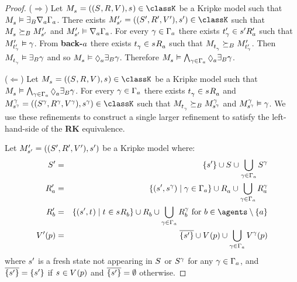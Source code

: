\begin{proof}
($\Rightarrow$) Let $\kPModelAndTuple{\kStateS} \in \classK$ be a Kripke model such that $\kPModel{\kStateS} \entails \somerefsBs \coversA \Gamma_\agentA$.
There exists $\kPModelAndTupleP{\kStateSP} \in \classK$ such that $\kPModel{\kStateS} \simulatesBs \kPModelP{\kStateSP}$ and $\kPModelP{\kStateSP} \entails \coversA \Gamma_\agentA$.
For every $\gamma \in \Gamma_\agentA$ there exists $\kStateTP_\gamma \in \kSuccessorsPA{\kStateSP}$ such that $\kPModelP{\kStateTP_\gamma} \entails \gamma$.
From {\bf back-$\agentA$} there exists $\kStateT_\gamma \in \kSuccessorsA{\kStateS}$ such that $\kPModel{\kStateT_\gamma} \simulatesBs \kPModelP{\kStateTP_\gamma}$.
Then $\kPModel{\kStateT_\gamma} \entails \somerefsBs \gamma$ and so $\kPModel{\kStateS} \entails \possibleA \somerefsBs \gamma$.
Therefore $\kPModel{\kStateS} \entails \bigwedge_{\gamma \in \Gamma_\agentA} \possibleA \somerefsBs \gamma$.

($\Leftarrow$) Let $\kPModelAndTuple{\kStateS} \in \classK$ be a Kripke model such that $\kPModel{\kStateS} \entails \bigwedge_{\gamma \in \Gamma_\agentA} \possibleA \somerefsBs \gamma$.
For every $\gamma \in \Gamma_\agentA$ there exists $\kStateT_\gamma \in \kSuccessorsA{\kStateS}$ and $\kPModelAndTuple[\gamma]{\kStateS[\gamma]} \in \classK$ such that $\kPModel{\kStateT_\gamma} \simulatesBs \kPModel[\gamma]{\kStateS[\gamma]}$ and $\kPModel[\gamma]{\kStateS[\gamma]} \entails \gamma$.
We use these refinements to construct a single larger refinement to satisfy the left-hand-side of the {\bf RK} equivalence.

Let $\kPModelAndTupleP{\kStateSP}$ be a Kripke model where:
\begin{eqnarray*}
    \kStatesP &=& \{\kStateSP\} \cup \kStates \cup \bigcup_{\gamma \in \Gamma_\agentA} \kStates[\gamma]\\
    \kAccessibilityPA &=& \{(\kStateSP, \kStateS[\gamma]) \mid \gamma \in \Gamma_\agentA\} \cup \kAccessibilityA \cup \bigcup_{\gamma \in \Gamma_\agentA} \kAccessibilityA[\gamma]\\
    \kAccessibilityPB &=& \{(\kStateSP, \kStateT) \mid \kStateT \in \kSuccessorsB{\kStateS}\} \cup \kAccessibilityB \cup \bigcup_{\gamma \in \Gamma_\agentA} \kAccessibilityB[\gamma] \text{ for } \agentB \in \agents \setminus \{\agentA\}\\
    \kValuationP(\atomP) &=& \overline{\{\kStateSP\}} \cup \kValuation(\atomP) \cup \bigcup_{\gamma \in \Gamma_\agentA} \kValuation[\gamma](\atomP)
\end{eqnarray*}
where $\kStateSP$ is a fresh state not appearing in $\kStates$ or $\kStates[\gamma]$ for any $\gamma \in \Gamma_\agentA$, and $\overline{\{\kStateSP\}} = \{\kStateSP\}$ if $\kStateS \in \kValuation(\atomP)$ and $\overline{\{\kStateSP\}} = \emptyset$ otherwise.


\end{proof}
